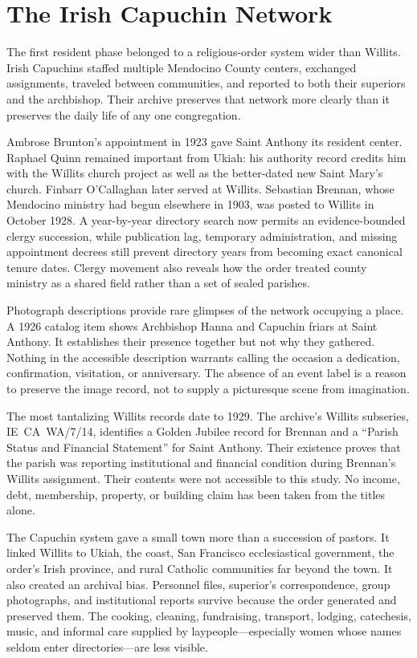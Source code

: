 \section{The Irish Capuchin Network}

The first resident phase belonged to a religious-order system wider than Willits. Irish Capuchins staffed multiple Mendocino County centers, exchanged assignments, traveled between communities, and reported to both their superiors and the archbishop. Their archive preserves that network more clearly than it preserves the daily life of any one congregation.

Ambrose Brunton's appointment in 1923 gave Saint Anthony its resident center. Raphael Quinn remained important from Ukiah: his authority record credits him with the Willits church project as well as the better-dated new Saint Mary's church. Finbarr O'Callaghan later served at Willits. Sebastian Brennan, whose Mendocino ministry had begun elsewhere in 1903, was posted to Willits in October 1928. A year-by-year directory search now permits an evidence-bounded clergy succession, while publication lag, temporary administration, and missing appointment decrees still prevent directory years from becoming exact canonical tenure dates. Clergy movement also reveals how the order treated county ministry as a shared field rather than a set of sealed parishes.

Photograph descriptions provide rare glimpses of the network occupying a place. A 1926 catalog item shows Archbishop Hanna and Capuchin friars at Saint Anthony. It establishes their presence together but not why they gathered. Nothing in the accessible description warrants calling the occasion a dedication, confirmation, visitation, or anniversary. The absence of an event label is a reason to preserve the image record, not to supply a picturesque scene from imagination.

The most tantalizing Willits records date to 1929. The archive's Willits subseries, IE~CA~WA/7/14, identifies a Golden Jubilee record for Brennan and a ``Parish Status and Financial Statement'' for Saint Anthony. Their existence proves that the parish was reporting institutional and financial condition during Brennan's Willits assignment. Their contents were not accessible to this study. No income, debt, membership, property, or building claim has been taken from the titles alone.

The Capuchin system gave a small town more than a succession of pastors. It linked Willits to Ukiah, the coast, San Francisco ecclesiastical government, the order's Irish province, and rural Catholic communities far beyond the town. It also created an archival bias. Personnel files, superior's correspondence, group photographs, and institutional reports survive because the order generated and preserved them. The cooking, cleaning, fundraising, transport, lodging, catechesis, music, and informal care supplied by laypeople---especially women whose names seldom enter directories---are less visible.

